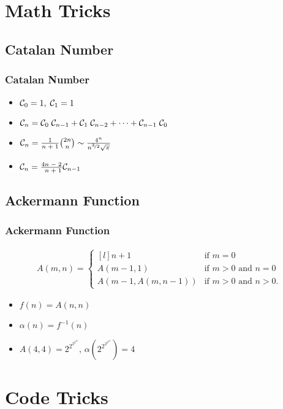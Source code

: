 \section{Math Tricks}

\subsection{Catalan Number}
\begin{frame}
	\frametitle{Catalan Number}
	\begin{itemize}
		\setlength\itemsep{1em}
		\item 
			${\cal C}_0 = 1, \; {\cal C}_1 = 1$
		\item 
			${\cal C}_n = {\cal C}_0\;{\cal C}_{n-1} + {\cal
			C}_{1}\;{\cal C}_{n-2} + \cdots + {\cal C}_{n-1}\;{\cal
			C}_{0}$
		\item
			${\cal C}_n = \frac{1}{n \; + \;1} \binom{2n}{n} \sim \frac{4^n}{n^{\nicefrac{3}{2}} \sqrt{\pi}}$
		\item 
			${\cal C}_n = \frac{4n \;-\; 2}{\phantom{4} n \;+\; 1} {\cal C}_{n-1}$
	\end{itemize}
\end{frame}

\subsection{Ackermann Function}
\begin{frame}
	\frametitle{Ackermann Function}
	\begin{align*}
		A(m, n) = \left\{\begin{matrix*}[l]
			n+1 & \text{if } m = 0\\ 
			A(m-1, 1) & \text{if } m > 0 \text{ and } n = 0\\ 
			A(m-1, A(m, n-1)) & \text{if } m > 0 \text{ and } n > 0.
			\end{matrix*}\right.
	\end{align*}

	\begin{itemize}
		\setlength\itemsep{1em}
		\item 
			$f(n) = A(n, n)$
		\item 
			$\alpha(n) = f^{-1}(n)$
		\item
			$A(4, 4) = 2^{2^{2^{2^{16}}}}$, $\alpha(2^{2^{2^{2^{16}}}}) = 4$
	\end{itemize}
\end{frame}

\section{Code Tricks}

